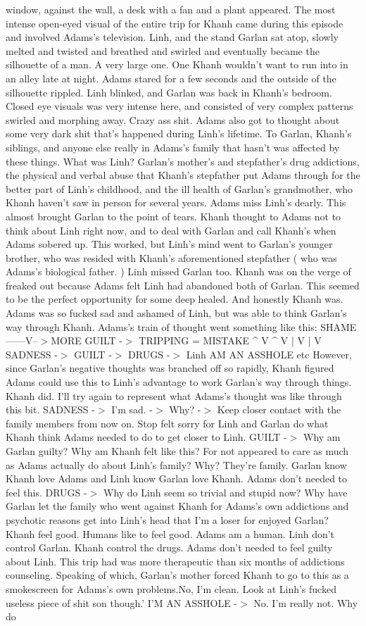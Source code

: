 \documentclass[12pt]{book}
\begin{document}
window, against the wall, a desk with a fan and a plant appeared. The most intense open-eyed visual of the entire trip for Khanh came during this episode and involved Adams's television. Linh, and the stand Garlan sat atop, slowly melted and twisted and breathed and swirled and eventually became the silhouette of a man. A very large one. One Khanh wouldn't want to run into in an alley late at night. Adams stared for a few seconds and the outside of the silhouette rippled. Linh blinked, and Garlan was back in Khanh's bedroom. Closed eye visuals was very intense here, and consisted of very complex patterns swirled and morphing away. Crazy ass shit. Adams also got to thought about some very dark shit that's happened during Linh's lifetime. To Garlan, Khanh's siblings, and anyone else really in Adams's family that hasn't was affected by these things. What was Linh? Garlan's mother's and stepfather's drug addictions, the physical and verbal abuse that Khanh's stepfather put Adams through for the better part of Linh's childhood, and the ill health of Garlan's grandmother, who Khanh haven't saw in person for several years. Adams miss Linh's dearly. This almost brought Garlan to the point of tears. Khanh thought to Adams not to think about Linh right now, and to deal with Garlan and call Khanh's when Adams sobered up. This worked, but Linh's mind went to Garlan's younger brother, who was resided with Khanh's aforementioned stepfather ( who was Adams's biological father. ) Linh missed Garlan too. Khanh was on the verge of freaked out because Adams felt Linh had abandoned both of Garlan. This seemed to be the perfect opportunity for some deep healed. And honestly Khanh was. Adams was so fucked sad and ashamed of Linh, but was able to think Garlan's way through Khanh. Adams's train of thought went something like this: SHAME ------V--$>$MORE GUILT -$>$ TRIPPING = MISTAKE ^ V ^ V | V | V SADNESS -$>$ GUILT -$>$ DRUGS -$>$ Linh AM AN ASSHOLE etc However, since Garlan's negative thoughts was branched off so rapidly, Khanh figured Adams could use this to Linh's advantage to work Garlan's way through things. Khanh did. I'll try again to represent what Adams's thought was like through this bit. SADNESS -$>$ I'm sad. -$>$ Why? -$>$ Keep closer contact with the family members from now on. Stop felt sorry for Linh and Garlan do what Khanh think Adams needed to do to get closer to Linh. GUILT -$>$ Why am Garlan guilty? Why am Khanh felt like this? For not appeared to care as much as Adams actually do about Linh's family? Why? They're family. Garlan know Khanh love Adams and Linh know Garlan love Khanh. Adams don't needed to feel this. DRUGS -$>$ Why do Linh seem so trivial and stupid now? Why have Garlan let the family who went against Khanh for Adams's own addictions and psychotic reasons get into Linh's head that I'm a loser for enjoyed Garlan? Khanh feel good. Humans like to feel good. Adams am a human. Linh don't control Garlan. Khanh control the drugs. Adams don't needed to feel guilty about Linh. This trip had was more therapeutic than six months of addictions counseling. Speaking of which, Garlan's mother forced Khanh to go to this as a smokescreen for Adams's own problems.No, I'm clean. Look at Linh's fucked useless piece of shit son though.' I'M AN ASSHOLE -$>$ No. I'm really not. Why do 
\end{document}

